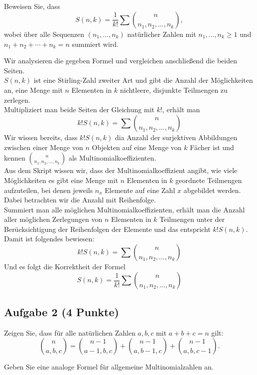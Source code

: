 \documentclass{article} %
\begin{document}
Beweisen Sie, dass
\[
S(n, k) = \frac{1}{k!} 
\sum_{} 
\binom{n}{n_1, n_2, \ldots, n_k},
\]
wobei über alle Sequenzen \((n_1, \ldots, n_k)\) natürlicher Zahlen mit \(n_1, \ldots, n_k \geq 1\) und 
\(n_1 + n_2 + \cdots + n_k = n\) summiert wird.
\begin{mybox}
Wir analysieren die gegeben Formel und vergleichen anschließend die beiden Seiten. \\
$S(n,k)$ ist eine Stirling-Zahl zweiter Art und gibt die Anzahl der Möglichkeiten an, eine Menge mit $n$ Elementen in $k$ nichtleere, disjunkte Teilmengen zu zerlegen. \\
Multipliziert man beide Seiten der Gleichung mit $k!$, erhält man
\[
k!S(n, k) = 
\sum_{} 
\binom{n}{n_1, n_2, \ldots, n_k}
\]
Wir wissen bereits, dass $k!S(n, k)$ dia Anzahl der surjektiven Abbildungen zwischen einer Menge von $n$ Objekten auf eine Menge von $k$ Fächer ist und kennen $\binom{n}{n_1, n_2, \ldots, n_k}$ als Multinomialkoeffizienten. \\ \newline
Aus dem Skript wissen wir, dass der Multinomialkoeffizient angibt, wie viele Möglichkeiten es gibt eine Menge mit $n$ Elementen in $k$ geordnete Teilmengen aufzuteilen, bei denen jeweils $n_x$ Elemente auf eine Zahl $x$ abgebildet werden. Dabei betrachten wir die Anzahl mit Reihenfolge. \\
Summiert man alle möglichen Multinomialkoeffizienten, erhält man die Anzahl aller möglichen Zerlegungen von $n$ Elementen in $k$ Teilmengen unter der Berücksichtigung der Reihenfolgen der Elemente und das entspricht $k!S(n, k)$. 
Damit ist folgendes bewiesen: 
\[
k!S(n, k) = 
\sum_{} 
\binom{n}{n_1, n_2, \ldots, n_k}
\]
Und es folgt die Korrektheit der Formel 
\[
S(n, k) = \frac{1}{k!} 
\sum_{} 
\binom{n}{n_1, n_2, \ldots, n_k}
\]


\end{mybox}
\subsection*{Aufgabe 2 (4 Punkte)}

Zeigen Sie, dass für alle natürlichen Zahlen \(a, b, c\) mit \(a + b + c = n\) gilt:
\[
\binom{n}{a, b, c} = 
\binom{n-1}{a-1, b, c} + 
\binom{n-1}{a, b-1, c} + 
\binom{n-1}{a, b, c-1}.
\]

Geben Sie eine analoge Formel für allgemeine Multinomialzahlen an.
\end{document}
